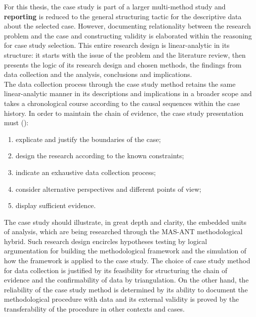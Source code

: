 \documentclass[11pt]{report}
\begin{document}
{{{{For this thesis, the case study is part of a larger multi-method study and \textbf{reporting} is reduced to the general structuring tactic for the descriptive data about the selected case.
However, documenting relationality between the research problem and the case and constructing validity is elaborated within the reasoning for case study selection.
This entire research design is linear-analytic in its structure: it starts with the issue of the problem and the literature review, then presents the logic of its research design and chosen methods, the findings from data collection and the analysis, conclusions and implications.
\\

The data collection process through the case study method retains the same linear-analytic manner in its descriptions and implications in a broader scope and takes a chronological course according to the causal sequences within the case history. In order to maintain the chain of evidence, the case study presentation must (\href{Yin} {\citealt{yin_case_2009}}):

\begin{enumerate}
\item explicate and justify the boundaries of the case;
\item design the research according to the known constraints;
\item indicate an exhaustive data collection process;
\item consider alternative perspectives and different points of view;
\item display sufficient evidence.
\end{enumerate}

The case study should illustrate, in great depth and clarity, the embedded units of analysis, which are being researched through the MAS-ANT methodological hybrid. Such research design encircles hypotheses testing by logical argumentation for building the methodological framework and the simulation of how the framework is applied to the case study. The choice of case study method for data collection is justified by its feasibility for structuring the chain of evidence and the confirmability of data by triangulation. On the other hand, the reliability of the case study method is determined by its ability to document the methodological procedure with data and its external validity is proved by the transferability of the procedure in other contexts and cases.
\\

}}}}
\end{document}
